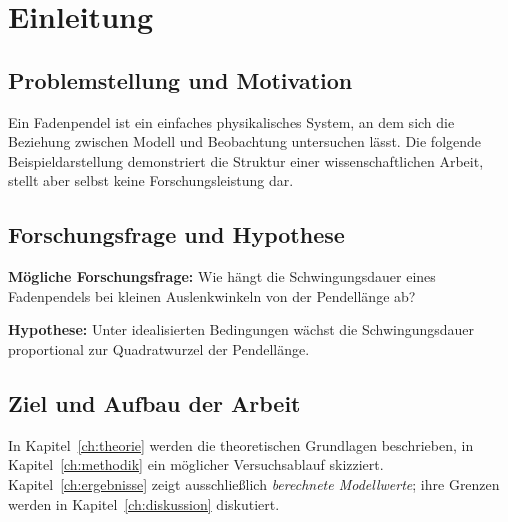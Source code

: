 \chapter{Einleitung}
\label{ch:einleitung}

\section{Problemstellung und Motivation}
Ein Fadenpendel ist ein einfaches physikalisches System, an dem sich
die Beziehung zwischen Modell und Beobachtung untersuchen lässt.
Die folgende Beispieldarstellung demonstriert die Struktur einer
wissenschaftlichen Arbeit, stellt aber selbst keine Forschungsleistung dar.

\section{Forschungsfrage und Hypothese}
\textbf{Mögliche Forschungsfrage:} Wie hängt die Schwingungsdauer eines
Fadenpendels bei kleinen Auslenkwinkeln von der Pendellänge ab?

\textbf{Hypothese:} Unter idealisierten Bedingungen wächst die
Schwingungsdauer proportional zur Quadratwurzel der Pendellänge.

\section{Ziel und Aufbau der Arbeit}
In Kapitel~\ref{ch:theorie} werden die theoretischen Grundlagen
beschrieben, in Kapitel~\ref{ch:methodik} ein möglicher Versuchsablauf
skizziert. Kapitel~\ref{ch:ergebnisse} zeigt ausschließlich
\emph{berechnete Modellwerte}; ihre Grenzen werden in
Kapitel~\ref{ch:diskussion} diskutiert.
